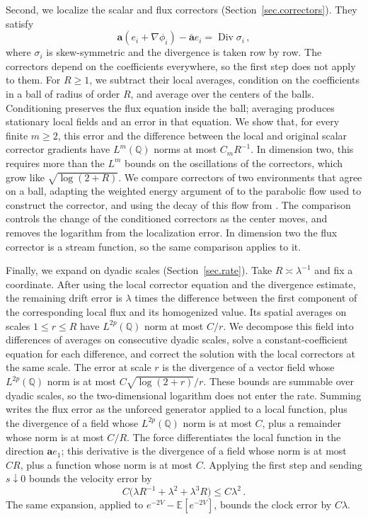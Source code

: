 \documentclass[11pt]{amsart}
\theoremstyle{definition}
\theoremstyle{remark}
\numberwithin{equation}{section}
\newcommand{\E}{\mathbb E}
\newcommand{\Q}{\mathbb Q}
\renewcommand{\a}{\mathbf a}
\newcommand{\ahom}{\overline{\mathbf a}}
\newcommand{\Div}{\operatorname{Div}}
\begin{document}
Second, we localize the scalar and flux correctors (Section~\ref{sec.correctors}). They satisfy
\begin{equation*}
 \a(e_i+\nabla\phi_i)-\ahom e_i=\Div\sigma_i\, ,
\end{equation*}
where $\sigma_i$ is skew-symmetric and the divergence is taken row by row. The correctors depend on the coefficients everywhere, so the first step does not apply to them. For $R\geq1$, we subtract their local averages, condition on the coefficients in a ball of radius of order $R$, and average over the centers of the balls. Conditioning preserves the flux equation inside the ball; averaging produces stationary local fields and an error in that equation. We show that, for every finite $m\geq2$, this error and the difference between the local and original scalar corrector gradients have $L^m(\Q)$ norms at most $C_mR^{-1}$. In dimension two, this requires more than the $L^m$ bounds on the oscillations of the correctors, which grow like $\sqrt{\log(2+R)}$. We compare correctors of two environments that agree on a ball, adapting the weighted energy argument of \citet[Lemma~12]{GloriaOtto2016corrector} to the parabolic flow used to construct the corrector, and using the decay of this flow from \citet[Theorem~9.1]{AKM2019book}. The comparison controls the change of the conditioned correctors as the center moves, and removes the logarithm from the localization error. In dimension two the flux corrector is a stream function, so the same comparison applies to it.

Finally, we expand on dyadic scales (Section~\ref{sec.rate}). Take $R\asymp\lambda^{-1}$ and fix a coordinate. After using the local corrector equation and the divergence estimate, the remaining drift error is $\lambda$ times the difference between the first component of the corresponding local flux and its homogenized value. Its spatial averages on scales $1\leq r\leq R$ have $L^{2p}(\Q)$ norm at most $C/r$. We decompose this field into differences of averages on consecutive dyadic scales, solve a constant-coefficient equation for each difference, and correct the solution with the local correctors at the same scale. The error at scale $r$ is the divergence of a vector field whose $L^{2p}(\Q)$ norm is at most $C\sqrt{\log(2+r)}/r$. These bounds are summable over dyadic scales, so the two-dimensional logarithm does not enter the rate. Summing writes the flux error as the unforced generator applied to a local function, plus the divergence of a field whose $L^{2p}(\Q)$ norm is at most $C$, plus a remainder whose norm is at most $C/R$. The force differentiates the local function in the direction $\a e_1$; this derivative is the divergence of a field whose norm is at most $CR$, plus a function whose norm is at most $C$. Applying the first step and sending $s\downarrow0$ bounds the velocity error by
\begin{equation*}
 C\bigl(\lambda R^{-1}+\lambda^2+\lambda^3R\bigr)
 \leq C\lambda^2\, .
\end{equation*}
The same expansion, applied to $e^{-2V}-\E[e^{-2V}]$, bounds the clock error by $C\lambda$.
\end{document}
